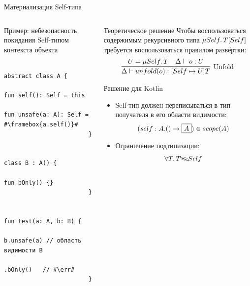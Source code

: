 \documentclass[usenames, dvipsnames]{beamer}
\newcommand{\err}[0]{\textcolor{red}{ошибка}}
\begin{document}
    \begin{frame}[fragile]{Материализация Self-типа}
        \vspace{-1em}
        \begin{columns}[onlytextwidth]
            \begin{column}[t]{0.485\textwidth}
                \begin{block}{Пример: небезопасность покидания Self-типом контекста объекта}
                    \begin{verbatim}
                        abstract class A {
                            fun self(): Self = this
                            fun unsafe(a: A): Self = #\framebox{a.self()}#
                        }

                        class B : A() {
                            fun bOnly() {}
                        }

                        fun test(a: A, b: B) {
                            b.unsafe(a) // область видимости B
                             .bOnly()   // #\err#
                        }
                    \end{verbatim}
                \end{block}
            \end{column}\hfill%
            \begin{column}[t]{0.485\textwidth}
                \begin{block}{Теоретическое решение}
                    Чтобы воспользоваться содержимым рекурсивного типа $\mu Self\ldotp T[Self]$ требуется воспользоваться правилом развёртки:
                    \begin{equation*}
                        \infer[\text{Unfold}]{
                            \Delta \vdash unfold(o) : [Self \mapsto U]T
                        }{
                            U = \mu Self \ldotp T & \Delta \vdash o : U
                        }
                    \end{equation*}
                \end{block}
                \begin{block}{Решение для Kotlin}
                    \begin{itemize}
                        \item Self-тип должен переписываться в тип получателя в его области видимости:
                        \[(self : A.() \to \framebox{$A$}) \in scope(A)\]
                        \item Ограничение подтипизации: \[\forall T \ldotp T \bcancel{<:} Self\]
                    \end{itemize}
                \end{block}
            \end{column}
        \end{columns}
    \end{frame}
\end{document}
